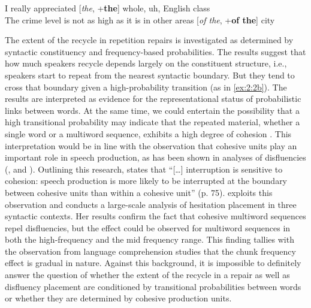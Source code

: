 \ea
    \ea
	\label{ex:2:2a}
	I really appreciated [\textit{the}, +\textbf{the}] whole, uh, English class\\

    \ex
	\label{ex:2:2b}
	The crime level is not as high as it is in other areas [\textit{of the}, +\textbf{of the}] city\\
	\hspace*{52mm} \citep[][481]{kapatsinski2005}
	\z
\z

\noindent The extent of the recycle in repetition repairs is investigated as determined by syntactic constituency and frequency-based probabilities. The results suggest that how much speakers recycle depends largely on the constituent structure, i.e., speakers start to repeat from the nearest syntactic boundary. But they tend to cross that boundary given a high-probability transition (as in \ref{ex:2:2b}). The results are interpreted as evidence for the representational status of probabilistic links between words. At the same time, we could entertain the possibility that a high transitional probability may indicate that the repeated material, whether a single word or a multiword sequence, exhibits a high degree of cohesion \citep[for the effect of frequency on interruptibility of words, see][]{kapatsinski2010}. This interpretation would be in line with the observation that cohesive units play an important role in speech production, as has been shown in analyses of disfluencies (\citealt[for reviews, see][74--75]{kapatsinski2010}, and \citealt[][]{schneider2014}). Outlining this research, \citet{kapatsinski2010} states that ``[\dots] interruption is sensitive to cohesion: speech production is more likely to be interrupted at the boundary between cohesive units than within a cohesive unit'' (p. 75). \citet{schneider2014} exploits this observation and conducts a large-scale analysis of hesitation placement in three syntactic contexts. Her results confirm the fact that cohesive multiword sequences repel disfluencies, but the effect could be observed for multiword sequences in both the high-frequency and the mid frequency range. This finding tallies with the observation from language comprehension studies \citep[cf.][]{reali-christiansen,arnon-snider} that the chunk frequency effect is gradual in nature. Against this background, it is impossible to definitely answer the question of whether the extent of the recycle in a repair as well as disfluency placement are conditioned by transitional probabilities between words or whether they are determined by cohesive production units.

